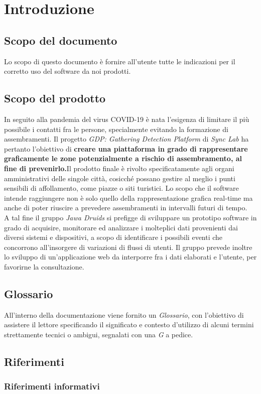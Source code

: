\chapter{Introduzione}\label{Introduzione}

\section{Scopo del documento}\label{IntroduzioneScopoDelDocumento}

Lo scopo di questo documento è fornire all'utente tutte le indicazioni per il corretto uso del software da noi prodotti.

\section{Scopo del prodotto}\label{IntroduzioneScopoDelProdotto}

In seguito alla pandemia del virus COVID-19 è nata l'esigenza di limitare il più possibile i
contatti fra le persone, specialmente evitando la formazione di assembramenti. 
Il progetto \textit{GDP: Gathering Detection Platform} di \textit{Sync Lab} ha pertanto l'obiettivo di \textbf{creare una piattaforma in grado di rappresentare graficamente le zone potenzialmente a rischio di assembramento, al fine di prevenirlo.}Il prodotto finale è rivolto specificatamente agli
organi amministrativi delle singole città, cosicché possano gestire al meglio i punti sensibili di
affollamento, come piazze o siti turistici. Lo scopo che il software intende raggiungere non è
solo quello della rappresentazione grafica real-time ma anche di poter riuscire a prevedere
assembramenti in intervalli futuri di tempo.
\\
A tal fine il gruppo \textit{Jawa Druids} si prefigge di sviluppare un prototipo software in grado di acquisire, monitorare ed analizzare i molteplici dati provenienti dai diversi sistemi e dispositivi, a scopo di identificare i possibili eventi che concorrono all'insorgere di variazioni di flussi di utenti. Il gruppo prevede inoltre lo sviluppo di un'applicazione web da interporre fra i dati elaborati e l'utente, per favorirne la consultazione.

\section{Glossario}\label{IntroduzioneGlossario}

All'interno della documentazione viene fornito un \textit{Glossario}, con l'obiettivo di assistere il lettore specificando il significato e contesto d'utilizzo di alcuni termini strettamente tecnici o ambigui, segnalati con una \textit{G} a pedice.

\section{Riferimenti}\label{IntroduzioneRiferimenti}

\subsection{Riferimenti informativi}\label{IntroudioneRiferimentiRiferimentiInformativi}